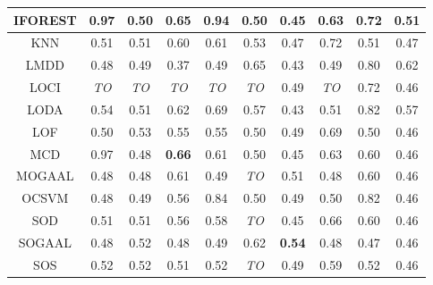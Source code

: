 \begin{table*}[!t]
\begin{center}
\begin{small}
\begin{sc}
\begin{tabular}{|c|c|c|c|c|c|c|c|c|c|}
\hline
        IFOREST &          0.97 &               0.50 & \textbf{0.65} &                0.94 &          0.50 &               0.45 &            0.63 &          0.72 &          0.51 \\
\hline
                KNN &          0.51 &               0.51 &          0.60 &                0.61 &          0.53 &               0.47 &            0.72 &          0.51 &          0.47 \\
\hline
                LMDD &          0.48 &               0.49 &          0.37 &                0.49 &          0.65 &               0.43 &            0.49 &          0.80 &          0.62 \\
\hline
                LOCI &   \textit{TO} &        \textit{TO} &   \textit{TO} &         \textit{TO} &   \textit{TO} &               0.49 &     \textit{TO} &          0.72 &          0.46 \\
\hline
                LODA &          0.54 &               0.51 &          0.62 &                0.69 &          0.57 &               0.43 &            0.51 &          0.82 &          0.57 \\
\hline
                LOF &          0.50 &               0.53 &          0.55 &                0.55 &          0.50 &               0.49 &            0.69 &          0.50 &          0.46 \\
\hline
                MCD &          0.97 &               0.48 & \textbf{0.66} &                0.61 &          0.50 &               0.45 &            0.63 &          0.60 &          0.46 \\
\hline
        MOGAAL &          0.48 &               0.48 &          0.61 &                0.49 &   \textit{TO} &               0.51 &            0.48 &          0.60 &          0.46 \\
\hline
                OCSVM &          0.48 &               0.49 &          0.56 &                0.84 &          0.50 &               0.49 &            0.50 &          0.82 &          0.46 \\
\hline
                SOD &          0.51 &               0.51 &          0.56 &                0.58 &   \textit{TO} &               0.45 &            0.66 &          0.60 &          0.46 \\
\hline
        SOGAAL &          0.48 &               0.52 &          0.48 &                0.49 &          0.62 &      \textbf{0.54} &            0.48 &          0.47 &          0.46 \\
\hline
                SOS &          0.52 &               0.52 &          0.51 &                0.52 &   \textit{TO} &               0.49 &            0.59 &          0.52 &          0.46 \\

\end{tabular}
\end{sc}
\end{small}
\end{center}
\end{table*}
